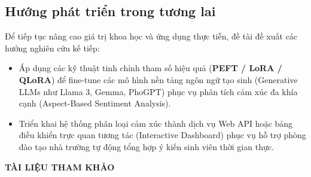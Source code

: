 \documentclass[12pt,a4paper]{article}
\begin{document}
\subsection{Hướng phát triển trong tương lai}\label{sec:future_work}
Để tiếp tục nâng cao giá trị khoa học và ứng dụng thực tiễn, đề tài đề xuất các hướng nghiên cứu kế tiếp:
\begin{itemize}[leftmargin=1.0cm, itemsep=2pt]
    \item[--] Áp dụng các kỹ thuật tinh chỉnh tham số hiệu quả (\textbf{PEFT / LoRA / QLoRA}) để fine-tune các mô hình nền tảng ngôn ngữ tạo sinh (Generative LLMs như Llama 3, Gemma, PhoGPT) phục vụ phân tích cảm xúc đa khía cạnh (Aspect-Based Sentiment Analysis).
    \item[--] Triển khai hệ thống phân loại cảm xúc thành dịch vụ Web API hoặc bảng điều khiển trực quan tương tác (Interactive Dashboard) phục vụ hỗ trợ phòng đào tạo nhà trường tự động tổng hợp ý kiến sinh viên thời gian thực.
\end{itemize}

\newpage
{}\label{sec:references}
\begin{center}
    {\large\bfseries TÀI LIỆU THAM KHẢO}
\end{center}
\vspace{0.8cm}
\end{document}
